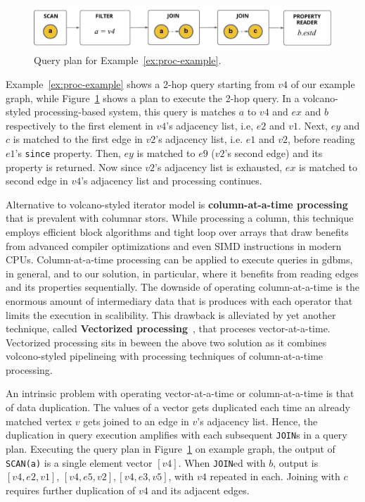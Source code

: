 \begin{figure}
	\hfill\includegraphics[scale=0.78]{img/proc-qp}\hfill
	\vspace{-10pt}
	\caption{Query plan for Example~\ref{ex:proc-example}.}
	\vspace{-8pt}
	\label{fig:proc-qp}
\end{figure}

Example~\ref{ex:proc-example} shows a 2-hop query starting from $v4$ of our example graph, while Figure~\ref{fig:proc-qp} shows a plan to execute the 2-hop query. In a volcano-styled processing-based system, this query is matches $a$ to $v4$ and $ex$ and $b$ respectively to the first element in $v4$'s adjacency list, i.e, $e2$ and $v1$. Next, $ey$ and $c$ is matched to the first edge in $v2$'s adjacency list, i.e. $e1$ and $v2$, before reading $e1$'s \texttt{since} property. Then, $ey$ is matched to $e9$ ($v2$'s second edge) and its property is returned. Now since $v2$'s adjacency list is exhausted, $ex$ is matched to second edge in $v4$'s adjacency list and processing continues. 

Alternative to volcano-styled iterator model is \textbf{column-at-a-time processing}~\cite{boncz-phd, monet-2decades} that is prevalent with columnar stors. While processing a column, this technique employs efficient block algorithms and tight loop over arrays that draw benefits from advanced compiler optimizations and even SIMD instructions in modern CPUs. Column-at-a-time processing can be applied to execute queries in \gls{gdbms}, in general, and to our solution, in particular, where it benefits from reading edges and its properties sequentially. The downside of operating column-at-a-time is the enormous amount of intermediary data that is produces with each operator that limits the execution in scalibility. This drawback is alleviated by yet another technique, called \textbf{Vectorized processing}~\cite{boncz-vectorwise1, boncz-monet-vectorized, boncz-vectorwise}, that proceses vector-at-a-time. Vectorized processing sits in beween the above two solution as it combines volcono-styled pipelineing with processing techniques of column-at-a-time processing. 

An intrinsic problem with operating vector-at-a-time or column-at-a-time is that of data duplication. The values of a vector gets duplicated each time an already matched vertex $v$ gets joined to an edge in $v$'s adjacency list. Hence, the duplication in query execution amplifies with each subsequent \texttt{JOIN}s in a query plan. Executing the query plan in Figure~\ref{fig:proc-qp} on example graph, the output of \texttt{SCAN(a)} is a single element vector $[v4]$. When \texttt{JOIN}ed with $b$, output is $[v4, e2, v1]$, $[v4, e5, v2], [v4, e3, v5]$, with $v4$ repeated in each. Joining with $c$ requires further duplication of $v4$ and its adjacent edges.

